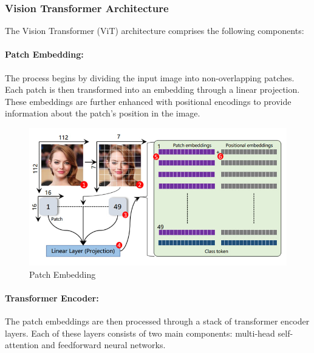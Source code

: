 \subsubsection{Vision Transformer Architecture}

The Vision Transformer (ViT) architecture comprises the following components:

\paragraph{Patch Embedding:}
The process begins by dividing the input image into non-overlapping patches. Each patch is then transformed into an embedding through a linear projection. These embeddings are further enhanced with positional encodings to provide information about the patch's position in the image.

\begin{figure}[htbp]
    \centering
    \includegraphics[width=6in]{img/patchembedding.jpg}
    \caption{Patch Embedding}
\end{figure}

\paragraph{Transformer Encoder:}
The patch embeddings are then processed through a stack of transformer encoder layers. Each of these layers consists of two main components: multi-head self-attention and feedforward neural networks.


